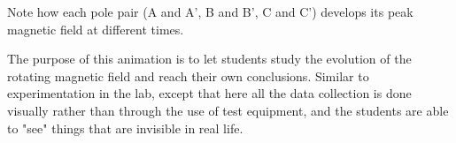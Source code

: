 \vfil \eject







Note how each pole pair (A and A', B and B', C and C') develops its peak magnetic field at different times.







The purpose of this animation is to let students study the evolution of the rotating magnetic field and reach their own conclusions.  Similar to experimentation in the lab, except that here all the data collection is done visually rather than through the use of test equipment, and the students are able to "see" things that are invisible in real life.




